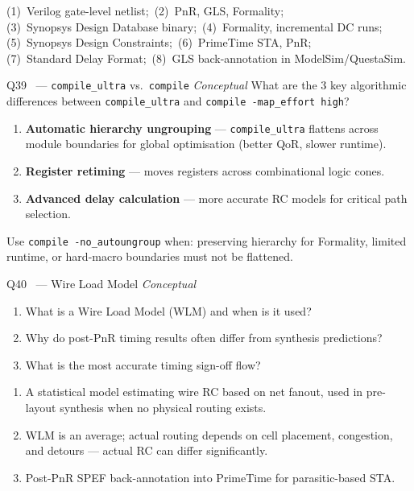 \documentclass[12pt,a4paper]{article}
\newcommand{\advanced}{%
  \fbox{\textcolor{advred}{\bfseries\sffamily\small ADVANCED}}}
\begin{document}
\begin{answerbox}
(1)~Verilog gate-level netlist;\ (2)~PnR, GLS, Formality;\\
(3)~Synopsys Design Database binary;\ (4)~Formality, incremental DC runs;\\
(5)~Synopsys Design Constraints;\ (6)~PrimeTime STA, PnR;\\
(7)~Standard Delay Format;\ (8)~GLS back-annotation in ModelSim/QuestaSim.
\end{answerbox}

\begin{questionbox}{Q39 \advanced\ --- \texttt{compile\_ultra} vs.\ \texttt{compile} \hfill\textit{Conceptual}}
What are the 3 key algorithmic differences between \texttt{compile\_ultra} and \texttt{compile -map\_effort high}?
\end{questionbox}

\begin{answerbox}
\begin{enumerate}
  \item \textbf{Automatic hierarchy ungrouping} --- \texttt{compile\_ultra} flattens across module boundaries for global optimisation (better QoR, slower runtime).
  \item \textbf{Register retiming} --- moves registers across combinational logic cones.
  \item \textbf{Advanced delay calculation} --- more accurate RC models for critical path selection.
\end{enumerate}
Use \texttt{compile -no\_autoungroup} when: preserving hierarchy for Formality, limited runtime, or hard-macro boundaries must not be flattened.
\end{answerbox}

\begin{questionbox}{Q40 \advanced\ --- Wire Load Model \hfill\textit{Conceptual}}
\begin{enumerate}[label=\textbf{\alph*)}]
  \item What is a Wire Load Model (WLM) and when is it used?
  \item Why do post-PnR timing results often differ from synthesis predictions?
  \item What is the most accurate timing sign-off flow?
\end{enumerate}
\end{questionbox}

\begin{answerbox}
\begin{enumerate}[label=\textbf{\alph*)}]
  \item A statistical model estimating wire RC based on net fanout, used in pre-layout synthesis when no physical routing exists.
  \item WLM is an average; actual routing depends on cell placement, congestion, and detours --- actual RC can differ significantly.
  \item Post-PnR SPEF back-annotation into PrimeTime for parasitic-based STA.
\end{enumerate}
\end{answerbox}
\end{document}
